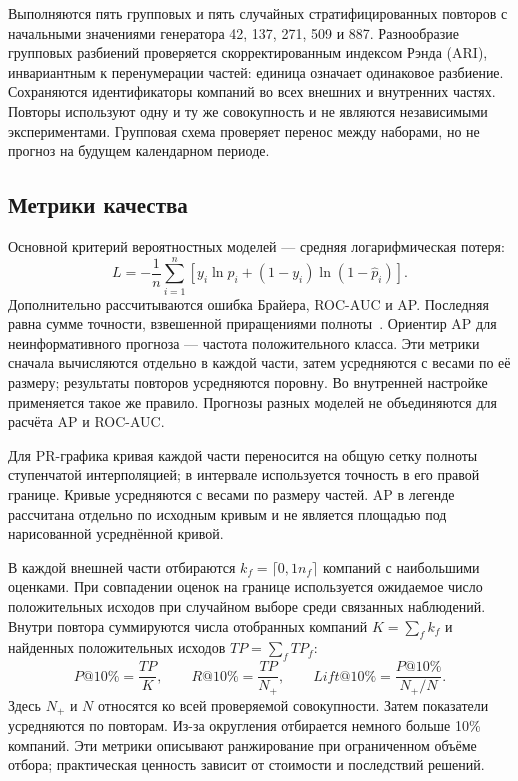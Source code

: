 Выполняются пять групповых и пять случайных стратифицированных повторов с начальными значениями генератора 42, 137, 271, 509 и 887. Разнообразие групповых разбиений проверяется скорректированным индексом Рэнда (ARI), инвариантным к перенумерации частей: единица означает одинаковое разбиение. Сохраняются идентификаторы компаний во всех внешних и внутренних частях. Повторы используют одну и ту же совокупность и не являются независимыми экспериментами. Групповая схема проверяет перенос между наборами, но не прогноз на будущем календарном периоде.

\subsection{Метрики качества}

Основной критерий вероятностных моделей --- средняя логарифмическая потеря:
\[
L=-\frac{1}{n}\sum_{i=1}^{n}\left[y_i\ln\widehat p_i+(1-y_i)\ln(1-\widehat p_i)\right].
\]
Дополнительно рассчитываются ошибка Брайера, ROC-AUC и AP. Последняя равна сумме точности, взвешенной приращениями полноты~\cite{sklearn-metrics}. Ориентир AP для неинформативного прогноза --- частота положительного класса. Эти метрики сначала вычисляются отдельно в каждой части, затем усредняются с весами по её размеру; результаты повторов усредняются поровну. Во внутренней настройке применяется такое же правило. Прогнозы разных моделей не объединяются для расчёта AP и ROC-AUC.

Для PR-графика кривая каждой части переносится на общую сетку полноты ступенчатой интерполяцией; в интервале используется точность в его правой границе. Кривые усредняются с весами по размеру частей. AP в легенде рассчитана отдельно по исходным кривым и не является площадью под нарисованной усреднённой кривой.

В каждой внешней части отбираются $k_f=\lceil0{,}1n_f\rceil$ компаний с наибольшими оценками. При совпадении оценок на границе используется ожидаемое число положительных исходов при случайном выборе среди связанных наблюдений. Внутри повтора суммируются числа отобранных компаний $K=\sum_f k_f$ и найденных положительных исходов $TP=\sum_f TP_f$:
\[
P@10\%=\frac{TP}{K},\qquad R@10\%=\frac{TP}{N_+},\qquad
Lift@10\%=\frac{P@10\%}{N_+/N}.
\]
Здесь $N_+$ и $N$ относятся ко всей проверяемой совокупности. Затем показатели усредняются по повторам. Из-за округления отбирается немного больше 10\% компаний. Эти метрики описывают ранжирование при ограниченном объёме отбора; практическая ценность зависит от стоимости и последствий решений.

